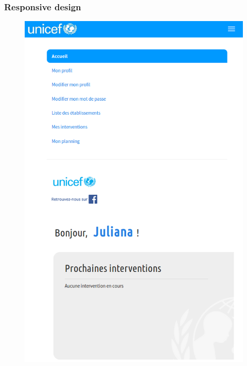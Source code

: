 \begin{frame}
\frametitle{Responsive design}
	\begin{multicols}{2}
		\begin{figure}[!h]
			\begin{center}
				\includegraphics[scale=0.16]{images/screenshot1.png}


\end{center}
\end{figure}
\end{multicols}
\end{frame}
